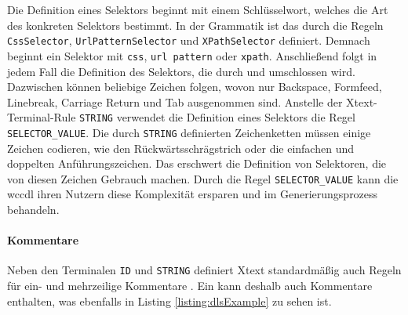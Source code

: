     Die Definition eines Selektors beginnt mit einem Schlüsselwort,
    welches die Art des konkreten Selektors bestimmt.
    In der Grammatik ist das durch die Regeln
    \texttt{CssSelector}, \texttt{UrlPatternSelector} und \texttt{XPathSelector} definiert.
    Demnach beginnt ein Selektor mit \texttt{css}, \texttt{url pattern} oder \texttt{xpath}.
    Anschließend folgt in jedem Fall die Definition des Selektors,
    die durch {\flqq } und {\frqq } umschlossen wird.
    Dazwischen können beliebige Zeichen folgen, wovon
    nur Backspace, Formfeed, Linebreak, Carriage Return und Tab ausgenommen sind.
    Anstelle der Xtext-Terminal-Rule \texttt{STRING} \cite[Kapitel "`Common Terminals"']{xtext:documentation}
    verwendet die Definition eines Selektors die Regel \texttt{SELECTOR\_VALUE}.
    Die durch \texttt{STRING} definierten Zeichenketten müssen einige Zeichen codieren,
    wie den Rückwärtsschrägstrich oder die einfachen und doppelten Anführungszeichen.
    Das erschwert die Definition von Selektoren, die von diesen Zeichen Gebrauch machen.
    Durch die Regel \texttt{SELECTOR\_VALUE} kann die \gls{wccdl} ihren Nutzern diese Komplexität
    ersparen und im Generierungsprozess behandeln.

    \paragraph{Kommentare}
    Neben den Terminalen \texttt{ID} und \texttt{STRING} definiert Xtext standardmäßig auch Regeln für ein- und mehrzeilige Kommentare
    \cite[Kapitel "`Common Terminals"']{xtext:documentation}.
    Ein {\classificationModel} kann deshalb auch Kommentare enthalten,
    was ebenfalls in Listing \ref{listing:dlsExample} zu sehen ist.
